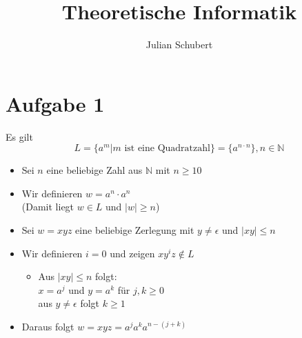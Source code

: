 \documentclass[14pt]{article}
\title{Theoretische Informatik}
\author{Julian Schubert}
\begin{document}
\section*{Aufgabe 1}
Es gilt 
\begin{equation*}
    L = \{ a^m | m \text{ ist eine Quadratzahl} \} = \{ a^{n \cdot n} \}, 
    n \in \mathbb{N} 
\end{equation*}

\begin{itemize}
    \item Sei $n$ eine beliebige Zahl aus $\mathbb{N}$ mit $n \geq 10$
    \item Wir definieren $w = a^n \cdot a^n$ \\
    (Damit liegt $w \in L$ und $|w| \geq n$)
    \item Sei $w = xyz$ eine beliebige Zerlegung mit $y \neq \epsilon$ und
    $|xy| \leq n$
    \item Wir definieren $i = 0$ und zeigen $xy^iz \notin L$
    \begin{itemize}
        \item Aus $|xy| \leq n$ folgt: \\
        $x = a^j$ und $y = a^k$ für $j, k \geq 0$ \\
        aus $y \neq \epsilon$ folgt $k \geq 1$
    \end{itemize}
    \item Daraus folgt $w = xyz = a^ja^ka^{n - (j+k)}$
\end{itemize}
\end{document}
